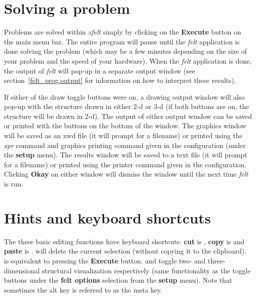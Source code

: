 \section{Solving a problem}

Problems are solved within {\em xfelt} simply by clicking on the {\bf Execute} 
button on the main menu bar.  The entire program will pause until the {\em felt} 
application is done solving the problem (which may be a few minutes depending 
on the size of your problem and the speed of your hardware).  When the 
{\em felt} application is done, the output of {\em felt} will pop-up in a 
separate output window (see section~\ref{felt_prog.output} for information
on how to interpret these results).  

If either of the draw toggle buttons were on, a 
drawing output window will also pop-up with the structure drawn in either 2-d 
or 3-d (if both buttons are on, the structure will be drawn in 2-d).  The 
output of either output window can be saved or printed with the buttons on the 
bottom of the window.  The graphics window will be saved as an xwd file (it 
will prompt for a filename) or printed using the {\em xpr} command and graphics 
printing command given in the configuration (under the {\bf setup} menu).  The 
results window will be saved to a text file (it will prompt for a filename) or 
printed using the printer command given in the configuration.  Clicking 
{\bf Okay} on either window will dismiss the window until the next time 
{\em felt} is run.	

\section{Hints and keyboard shortcuts}

The three basic editing functions have keyboard shortcuts: {\bf cut} is 
, {\bf copy} is  and {\bf paste} is .  
 will delete the current selection (without copying it to the 
clipboard).  is equivalent to pressing the {\bf Execute} button.  
 and  toggle two- and three-dimensional structural 
visualization respectively (same functionality as the toggle buttons under the
{\bf felt options} selection from the {\bf setup} menu).  Note that sometimes 
the alt key is referred to as the meta key.

